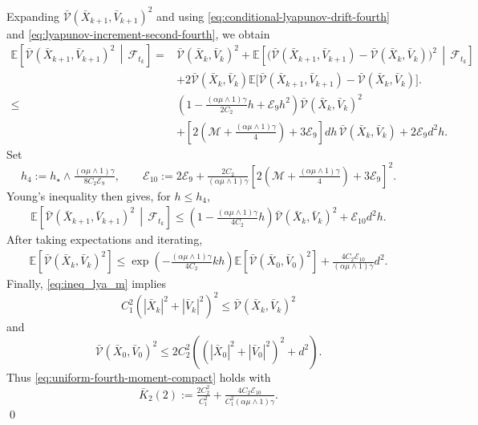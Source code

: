 \documentclass[12pt]{article}
\newenvironment{redtext}
  {\color{black}\ignorespaces}
  {\ignorespacesafterend}
\numberwithin{equation}{section}
\renewenvironment{proof}%
  {\begin{trivlist}%
   \item[]\ignorespaces}%
  {\qed\end{trivlist}}
\newcommand{\M}{\mathcal{M}}
\begin{document}
\begin{redtext}
\begin{proof}
Expanding
\(
\bar{\mathcal V}(\bar X_{k+1},\bar V_{k+1})^2
\)
and using \eqref{eq:conditional-lyapunov-drift-fourth} and
\eqref{eq:lyapunov-increment-second-fourth}, we obtain
\begin{align}
\mathbb E
\left[
\bar{\mathcal V}(\bar X_{k+1},\bar V_{k+1})^2
\,\middle|\,
\mathcal F_{t_k}
\right]
=&
\bar{\mathcal V}(\bar X_k,\bar V_k)^2
+
\mathbb E\left[
\big(
\bar{\mathcal V}(\bar X_{k+1},\bar V_{k+1})
-
\bar{\mathcal V}(\bar X_k,\bar V_k)
\big)^2
\,\middle|\,
\mathcal F_{t_k}
\right]
\nonumber\\
&
+
2
\bar{\mathcal V}(\bar X_k,\bar V_k)
\mathbb E
\Big[
\bar{\mathcal V}(\bar X_{k+1},\bar V_{k+1})
-
\bar{\mathcal V}(\bar X_k,\bar V_k)
\Big]
.
\nonumber\\
\leq&
\left(
1-
\tfrac{(\alpha\mu\wedge1)\gamma}{2C_2}h
+
\mathcal E_9h^2
\right)
\bar{\mathcal V}(\bar X_k,\bar V_k)^2
\nonumber\\
&
+
\left[
2
\left(
\M+
\tfrac{(\alpha\mu\wedge1)\gamma}{4}
\right)
+
3\mathcal E_9
\right]
dh\,
\bar{\mathcal V}(\bar X_k,\bar V_k)
+
2\mathcal E_9d^2h.
\label{eq:lyapunov-square-before-absorption-fourth}
\end{align}
Set
\begin{equation}
\label{eq:fourth-moment-stepsize}
h_4
:=
h_\star
\wedge
\tfrac{(\alpha\mu\wedge1)\gamma}
{8C_2\mathcal E_9},
\qquad
\mathcal E_{10}
:=
2\mathcal E_9
+
\tfrac{2C_2}{(\alpha\mu\wedge1)\gamma}
\left[
2
\left(
\M+
\tfrac{(\alpha\mu\wedge1)\gamma}{4}
\right)
+
3\mathcal E_9
\right]^2.
\end{equation}
Young's inequality then gives, for \(h\leq h_4\),
\begin{equation}
\label{eq:lyapunov-square-recursion-fourth}
\begin{aligned}
\mathbb E
\left[
\bar{\mathcal V}(\bar X_{k+1},\bar V_{k+1})^2
\,\middle|\,
\mathcal F_{t_k}
\right]
\leq
\left(
1-
\tfrac{(\alpha\mu\wedge1)\gamma}{4C_2}h
\right)
\bar{\mathcal V}(\bar X_k,\bar V_k)^2
+
\mathcal E_{10}d^2h.
\end{aligned}
\end{equation}
After taking expectations and iterating,
\begin{align}
\mathbb E
\left[
\bar{\mathcal V}(\bar X_k,\bar V_k)^2
\right]
\leq
\exp
\left(
-\tfrac{(\alpha\mu\wedge1)\gamma}{4C_2}kh
\right)
\mathbb E
\left[
\bar{\mathcal V}(\bar X_0,\bar V_0)^2
\right]
+
\tfrac{4C_2\mathcal E_{10}}
{(\alpha\mu\wedge1)\gamma}d^2.
\end{align}
Finally, \eqref{eq:ineq_lya_m} implies
\[
C_1^2
\left(
|\bar X_k|^2+|\bar V_k|^2
\right)^2
\leq
\bar{\mathcal V}(\bar X_k,\bar V_k)^2
\]
and
\[
\bar{\mathcal V}(\bar X_0,\bar V_0)^2
\leq
2C_2^2
\left(
\left(
|\bar X_0|^2+|\bar V_0|^2
\right)^2
+d^2
\right).
\]
Thus \eqref{eq:uniform-fourth-moment-compact} holds with
\[
\bar K_2(2)
:=
\tfrac{2C_2^2}{C_1^2}
+
\tfrac{4C_2\mathcal E_{10}}
{C_1^2(\alpha\mu\wedge1)\gamma}.
\]
\fi
\end{proof}


\end{redtext}
\end{document}
